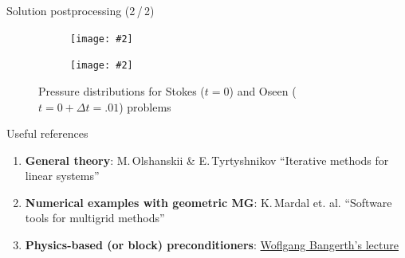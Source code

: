 \documentclass[svgnames]{beamer} %
\newcommand{\includegraphicsw}[2][1.]{\texttt{[image: \#2]}}
\begin{document}
		\begin{frame}{Solution postprocessing (2\,/\,2)}
			\begin{figure}
			\begin{subfigure}{1.\linewidth}\centering
				\includegraphicsw[.7]{chd_p_0.png}
			\end{subfigure}%
			\par\bigskip
			\begin{subfigure}{1.\linewidth}\centering
				\includegraphicsw[.7]{chd_p_1.png}
			\end{subfigure}
			\caption{Pressure distributions for Stokes ($t = 0$) and Oseen ($t = 0 + \Delta t = .01$) problems}
			\label{fig:chd_p}
			\end{figure}
		\end{frame}
	
	\begin{frame}{Useful references}
	\begin{enumerate}
		\item \textbf{General theory}: M.\,Olshanskii \& E.\,Tyrtyshnikov ``Iterative methods for linear systems'' 
		\item \textbf{Numerical examples with geometric MG}: K.\,Mardal et. al. ``Software tools for multigrid methods''
		\item \textbf{Physics-based (or block) preconditioners}: \href{https://www.math.colostate.edu/~bangerth/videos.676.38.html}{Woflgang Bangerth's lecture} 
	\end{enumerate}
	\end{frame}
\end{document}
